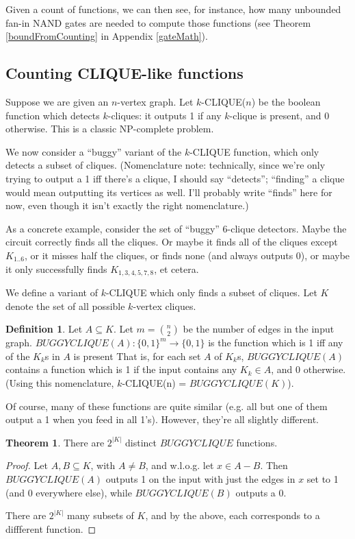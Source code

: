 \documentclass[12pt]{article}
\theoremstyle{definition}
\newtheorem{thm}{Theorem}[section]
\newtheorem{defn}{Definition}[section]
\begin{document}
Given a count of functions, we can then see, for instance,
how many unbounded fan-in NAND gates are needed to compute
those functions (see Theorem \ref{boundFromCounting}
in Appendix \ref{gateMath}).

\subsection{Counting CLIQUE-like functions}

Suppose we are given an $n$-vertex graph.
Let $k$-CLIQUE($n$) be the boolean function which
detects $k$-cliques: it outputs 1 if any $k$-clique
is present, and 0 otherwise. This is a classic
NP-complete problem.

We now consider a ``buggy'' variant of the $k$-CLIQUE function,
which only detects a subset of cliques. (Nomenclature note:
technically, since
we're only trying to output a 1 iff there's a clique, I should say
``detects''; ``finding'' a clique would mean outputting its
vertices as well. I'll probably write ``finds'' here for now,
even though it isn't exactly the right nomenclature.)

As a concrete example,
consider the set of ``buggy'' 6-clique detectors.
Maybe the circuit correctly
finds all the cliques. Or maybe it finds all of the cliques except $K_{1..6}$,
or it misses half the cliques, or finds none (and always outputs 0), or maybe
it only successfully finds $K_{1,3,4,5,7,8}$, et cetera.

We define a variant of $k$-CLIQUE which only
finds a subset of cliques.
Let $K$ denote the set of all possible
$k$-vertex cliques.

\begin{defn}
\label{BUGGYCLIQUE}
Let $A \subseteq K$.
Let $m = {n \choose 2}$ be the number of edges in the input graph.
$BUGGYCLIQUE(A): \{0,1\}^m \rightarrow \{0,1\}$ is the function which
is 1 iff any of the $K_k$s in $A$ is present 
That is, for each set $A$ of $K_k$s, $BUGGYCLIQUE(A)$
contains a function which is 1 if the input contains any $K_k \in A$,
and 0 otherwise. (Using this nomenclature,
$k$-CLIQUE(n) = $BUGGYCLIQUE(K)$).
\end{defn}

Of course, many of these functions are quite similar (e.g. all but one of them
output a 1 when you feed in all 1's). However, they're all slightly different.

\begin{thm}
\label{buggyDistinct}
There are  $2^{|K|}$ distinct $BUGGYCLIQUE$ functions.
\end{thm}
\begin{proof}

Let $A,B \subseteq K$, with $A \neq B$, and w.l.o.g.
let $x \in A-B$. Then $BUGGYCLIQUE(A)$ outputs 1 on the input
with just the edges in $x$ set to 1 (and 0 everywhere else),
while $BUGGYCLIQUE(B)$ outputs a 0.

There are $2^{|K|}$ many subsets of $K$,
and by the above, each corresponds to a diffferent function.
\end{proof}
\end{document}

